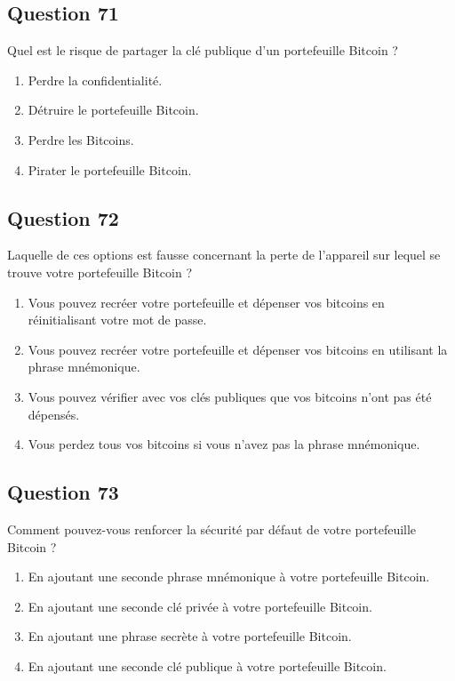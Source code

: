 \documentclass[12pt,a4paper]{article}
\begin{document}
\bigskip


\subsection*{Question 71}
Quel est le risque de partager la clé publique d'un portefeuille Bitcoin ?

\begin{enumerate}[label=\Alph*., leftmargin=*]
\item Perdre la confidentialité.
\item Détruire le portefeuille Bitcoin.
\item Perdre les Bitcoins.
\item Pirater le portefeuille Bitcoin.
\end{enumerate}

\bigskip


\subsection*{Question 72}
Laquelle de ces options est fausse concernant la perte de l'appareil sur lequel se trouve votre portefeuille Bitcoin ?

\begin{enumerate}[label=\Alph*., leftmargin=*]
\item Vous pouvez recréer votre portefeuille et dépenser vos bitcoins en réinitialisant votre mot de passe.
\item Vous pouvez recréer votre portefeuille et dépenser vos bitcoins en utilisant la phrase mnémonique.
\item Vous pouvez vérifier avec vos clés publiques que vos bitcoins n'ont pas été dépensés.
\item Vous perdez tous vos bitcoins si vous n'avez pas la phrase mnémonique.
\end{enumerate}

\bigskip


\subsection*{Question 73}
Comment pouvez-vous renforcer la sécurité par défaut de votre portefeuille Bitcoin ?

\begin{enumerate}[label=\Alph*., leftmargin=*]
\item En ajoutant une seconde phrase mnémonique à votre portefeuille Bitcoin.
\item En ajoutant une seconde clé privée à votre portefeuille Bitcoin.
\item En ajoutant une phrase secrète à votre portefeuille Bitcoin.
\item En ajoutant une seconde clé publique à votre portefeuille Bitcoin.
\end{enumerate}
\end{document}
